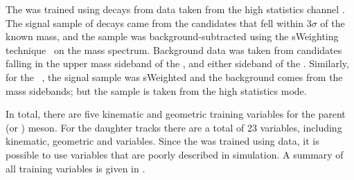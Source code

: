 
The \dstokkpi \bdt was trained using \dstokkpi decays from data taken from the
high statistics channel \decay{\Bsb}{\Dsp\pim}.
The signal sample of \Ds decays came from the \dstokkpi candidates that fell within $3\sigma$ of
the known \Ds mass, and the sample was
background-subtracted using the sWeighting technique~\cite{splot} on the \Bp mass spectrum.
Background data was taken from candidates falling in the upper mass sideband of the \Bp, and either
sideband of the \Ds.
Similarly, for the \phii\ \bdt, the signal sample was sWeighted and the background comes from the
\phii mass sidebands; but the sample is taken from the high statistics \bstojpsiphi mode.

In total, there are five kinematic and geometric training variables for the parent (\Ds or \phii) meson.
For the daughter tracks there are a total of 23 variables, including kinematic, geometric and \pid
variables.
Since the \bdt was trained using data, it is possible to use \pid variables that are poorly
described in simulation.
A summary of all training variables is given in .


